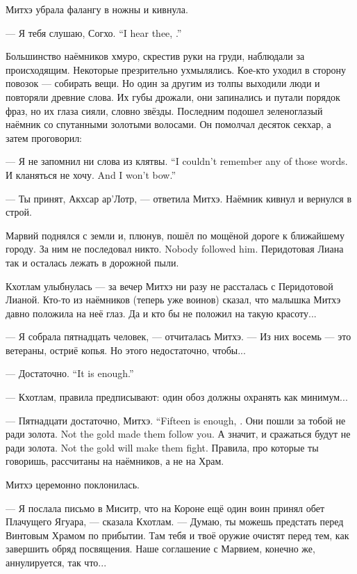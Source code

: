 Митхэ убрала фалангу в ножны и кивнула.

{--- Я тебя слушаю, Согхо.}
{``I hear thee, \Sogcho.''}

Большинство наёмников хмуро, скрестив руки на груди, наблюдали за происходящим.
Некоторые презрительно ухмылялись.
Кое-кто уходил в сторону повозок --- собирать вещи.
Но один за другим из толпы выходили люди и повторяли древние слова.
Их губы дрожали, они запинались и путали порядок фраз, но их глаза сияли, словно звёзды.
Последним подошел зеленоглазый наёмник со спутанными золотыми волосами.
Он помолчал десяток секхар, а затем проговорил:

{--- Я не запомнил ни слова из клятвы.}
{``I couldn't remember any of those words.}
{И кланяться не хочу.}
{And I won't bow.''}

--- Ты принят, Акхсар ар'Лотр, --- ответила Митхэ.
Наёмник кивнул и вернулся в строй.

Марвий поднялся с земли и, плюнув, пошёл по мощёной дороге к ближайшему городу.
{За ним не последовал никто.}
{Nobody followed him.}
Перидотовая Лиана так и осталась лежать в дорожной пыли.

\asterism

Кхотлам улыбнулась --- за вечер Митхэ ни разу не рассталась с Перидотовой Лианой.
Кто-то из наёмников (теперь уже воинов) сказал, что малышка Митхэ давно положила на неё глаз.
Да и кто бы не положил на такую красоту...

--- Я собрала пятнадцать человек, --- отчиталась Митхэ.
--- Из них восемь --- это ветераны, остриё копья.
Но этого недостаточно, чтобы...

{--- Достаточно.}
{``It is enough.''}

--- Кхотлам, правила предписывают: один обоз должны охранять как минимум...

{--- Пятнадцати достаточно, Митхэ.}
{``Fifteen is enough, \Mitchoe.}
{Они пошли за тобой не ради золота.}
{Not the gold made them follow you.}
{А значит, и сражаться будут не ради золота.}
{Not the gold will make them fight.}
Правила, про которые ты говоришь, рассчитаны на наёмников, а не на Храм.

Митхэ церемонно поклонилась.

--- Я послала письмо в Миситр, что на Короне ещё один воин принял обет Плачущего Ягуара, --- сказала Кхотлам.
--- Думаю, ты можешь предстать перед Винтовым Храмом по прибытии.
Там тебя и твоё оружие очистят перед тем, как завершить обряд посвящения.
Наше соглашение с Марвием, конечно же, аннулируется, так что...

